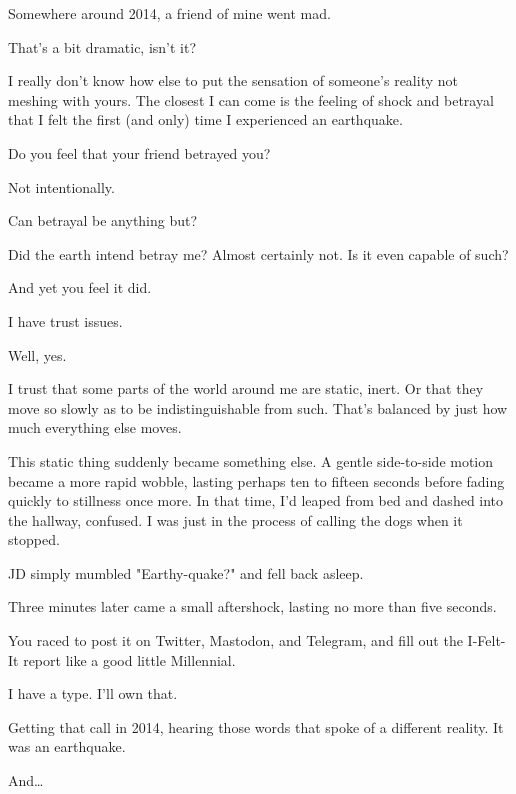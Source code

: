 Somewhere around 2014, a friend of mine went mad.

\begin{ally}
That's a bit dramatic, isn't it?
\end{ally}
I really don't know how else to put the sensation of someone's reality not meshing with yours. The closest I can come is the feeling of shock and betrayal that I felt the first (and only) time I experienced an earthquake.

\begin{ally}
Do you feel that your friend betrayed you?
\end{ally}
Not intentionally.

\begin{ally}
Can betrayal be anything but?
\end{ally}
Did the earth intend betray me? Almost certainly not. Is it even capable of such?

\begin{ally}
And yet you feel it did.
\end{ally}
I have trust issues.

\begin{ally}
Well, yes.
\end{ally}
I trust that some parts of the world around me are static, inert. Or that they move so slowly as to be indistinguishable from such. That's balanced by just how much everything else moves.

This static thing suddenly became something else. A gentle side-to-side motion became a more rapid wobble, lasting perhaps ten to fifteen seconds before fading quickly to stillness once more. In that time, I'd leaped from bed and dashed into the hallway, confused. I was just in the process of calling the dogs when it stopped.

JD simply mumbled "Earthy-quake?" and fell back asleep.

Three minutes later came a small aftershock, lasting no more than five seconds.

\begin{ally}
You raced to post it on Twitter, Mastodon, and Telegram, and fill out the I-Felt-It report like a good little Millennial.
\end{ally}
I have a type. I'll own that.

Getting that call in 2014, hearing those words that spoke of a different reality. It was an earthquake.

And\ldots{}

